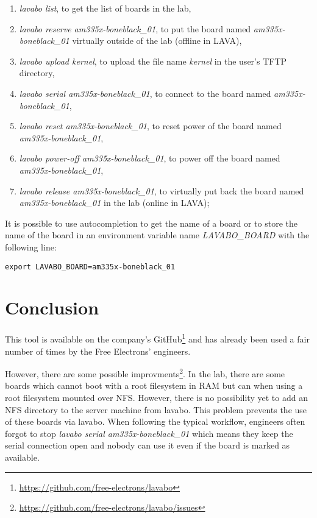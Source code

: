 \begin{enumerate}
  \item \textit{lavabo list}, to get the list of boards in the lab,
  \item \textit{lavabo reserve am335x-boneblack\_01}, to put the board named \textit{am335x-boneblack\_01} virtually outside of the lab (offline in LAVA),
  \item \textit{lavabo upload kernel}, to upload the file name \textit{kernel} in the user's TFTP directory,
  \item \textit{lavabo serial am335x-boneblack\_01}, to connect to the board named \textit{am335x-boneblack\_01},
  \item \textit{lavabo reset am335x-boneblack\_01}, to reset power of the board named \textit{am335x-boneblack\_01},
  \item \textit{lavabo power-off am335x-boneblack\_01}, to power off the board named \textit{am335x-boneblack\_01},
  \item \textit{lavabo release am335x-boneblack\_01}, to virtually put back the board named \textit{am335x-boneblack\_01} in the lab (online in LAVA);
\end{enumerate}

It is possible to use autocompletion to get the name of a board or to store the name of the board in an environment variable name \textit{LAVABO\_BOARD} with the following line:

\begin{verbatim}
export LAVABO_BOARD=am335x-boneblack_01
\end{verbatim}

\section{Conclusion}
This tool is available on the company's GitHub\footnote{\url{https://github.com/free-electrons/lavabo}} and has already been used a fair number of times by the Free Electrons' engineers.

However, there are some possible improvments\footnote{\url{https://github.com/free-electrons/lavabo/issues}}. In the lab, there are some boards which cannot boot with a root filesystem in RAM but can when using a root filesystem mounted over NFS. However, there is no possibility yet to add an NFS directory to the server machine from lavabo. This problem prevents the use of these boards via lavabo. When following the typical workflow, engineers often forgot to stop \textit{lavabo serial am335x-boneblack\_01} which means they keep the serial connection open and nobody can use it even if the board is marked as available.
